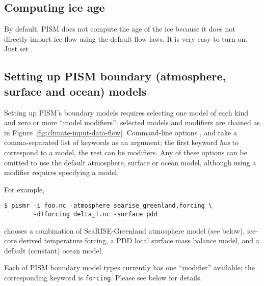 \subsection{Computing ice age} \label{subsect:age} By default, PISM does not compute the age of the ice because it does not directly impact ice flow using the default flow laws.   It is very easy to turn on.  Just set .

\subsection{Setting up PISM boundary (atmosphere, surface and ocean) models}
\label{sec:boundary-models}

Setting up PISM's boundary models requires selecting one model of each kind and zero or more ``model modifiers''; selected models and modifiers are chained as in Figure~\ref{fig:climate-input-data-flow}. Command-line options ,  and  take a comma-separated list of keywords as an argument; the first keyword \emph{has} to correspond to a model, the rest can be modifiers. Any of these options can be omitted to use the default atmosphere, surface or ocean model, although using a modifier requires specifying a model.

For example,
\begin{verbatim}
$ pismr -i foo.nc -atmosphere searise_greenland,forcing \
        -dTforcing delta_T.nc -surface pdd
\end{verbatim}%
chooses a combination of SeaRISE-Greenland atmosphere model (see below),  ice-core derived temperature forcing, a PDD local surface mass balance model, and a default (constant) ocean model.

Each of PISM boundary model types currently has one ``modifier'' available; the corresponding keyword is \texttt{forcing}. Please see below for details.

